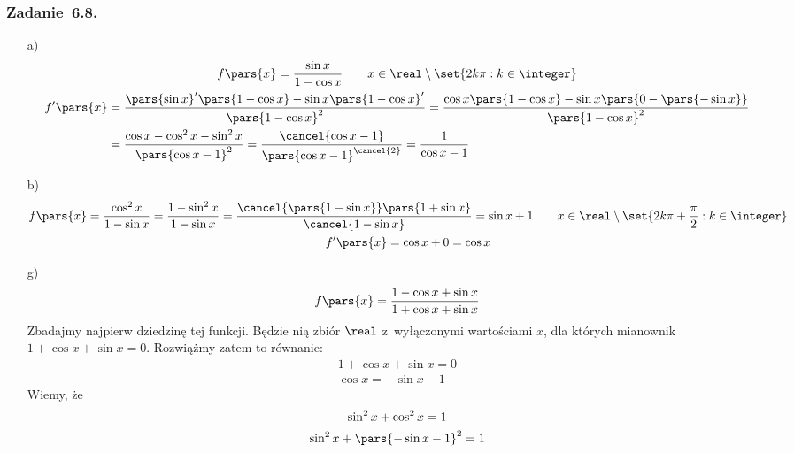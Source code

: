 \subsubsection*{Zadanie~6.8.}
\begin{itemize}
    \item[a)]
        \begin{gather*}
            f\pars{x} = \frac{\sin x}{1 - \cos x} \qquad x \in \real \setminus \set{2k\pi : k \in \integer}\\
            \begin{split}    
                f'\pars{x} 
                    &= \frac{\pars{\sin x}'\pars{1 - \cos x} - \sin x\pars{1 - \cos x}'}{\pars{1 - \cos x}^2}
                    = \frac{\cos x\pars{1 - \cos x} - \sin x\pars{0 - \pars{-\sin x}}}{\pars{1 - \cos x}^2}\\
                    &= \frac{\cos x - \cos^2x - \sin^2x}{\pars{\cos x - 1}^2}
                    = \frac{\cancel{\cos x - 1}}{\pars{\cos x - 1}^{\cancel{2}}}
                    = \frac{1}{\cos x - 1}
            \end{split}
        \end{gather*}
    \item[b)]
        \begin{gather*}
            f\pars{x} = \frac{\cos^2x}{1 - \sin x} = \frac{1 - \sin^2x}{1 - \sin x} = \frac{\cancel{\pars{1 - \sin x}}\pars{1 + \sin x}}{\cancel{1 - \sin x}} = \sin x + 1 \qquad x \in \real \setminus \set{2k\pi + \frac{\pi}{2} : k \in \integer}\\
            f'\pars{x} = \cos x + 0 = \cos x
        \end{gather*}
    \item[g)]
        \begin{equation*}
            f\pars{x} = \frac{1 - \cos x + \sin x}{1 + \cos x + \sin x}
        \end{equation*}
        Zbadajmy najpierw dziedzinę tej funkcji. Będzie nią zbiór \(\real\) z~wyłączonymi wartościami \(x\), dla których mianownik \(1 + \cos x + \sin x = 0\). Rozwiążmy zatem to równanie:
        \begin{gather*}
            1 + \cos x + \sin x = 0\\
            \cos x = -\sin x - 1
        \end{gather*}
        Wiemy, że
        \begin{gather*}
            \sin^2x + \cos^2x = 1\\
            \sin^2x + \pars{-\sin x - 1}^2 = 1\\

\end{gather*}
\end{itemize}
